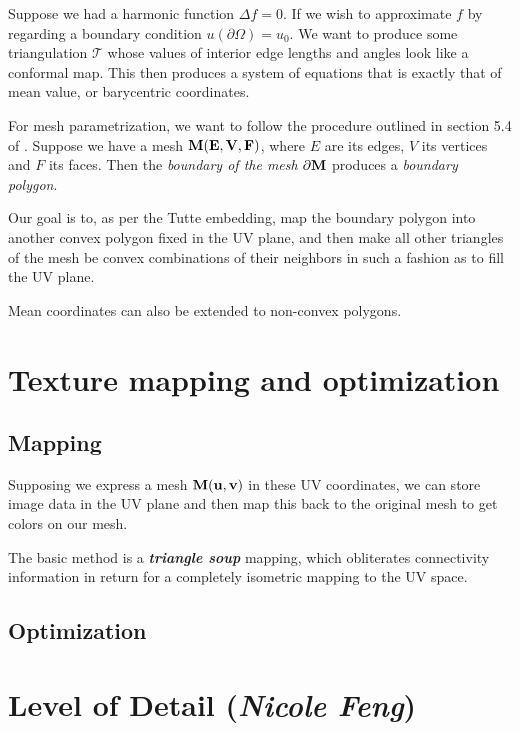 \spa

Suppose we had a harmonic function $\Delta f = 0$. If we wish to
approximate $f$ by regarding a boundary condition 
$u(\partial \Omega) = u_0$. We want to produce some triangulation
$\mathcal{T}$ whose values of interior edge lengths and angles
look like a conformal map. This then produces a system of equations
that is exactly that of mean value, or barycentric coordinates.

\spa

For mesh parametrization, we want to follow
the procedure outlined in section 5.4 of \cite{floater2}.
Suppose we have a mesh $\bf{M}(E,V, F)$, where $E$ are its edges,
$V$ its vertices and $F$ its faces. Then the \emph{boundary of the mesh}
$\partial\bf{M}$ produces a \emph{boundary polygon}.

\spa

Our goal is to, as per the Tutte embedding, map the boundary polygon
into another convex polygon fixed in the UV plane, and then make all
other triangles of the mesh be convex combinations of their neighbors
in such a fashion as to fill the UV plane.

\spa

Mean coordinates can also be extended to non-convex polygons.

\section{Texture mapping and optimization}

\subsection{Mapping}

Supposing we express a mesh $\bf{M(u,v)}$ in these UV coordinates,
we can store image data in the UV plane and then map this back to the
original mesh to get colors on our mesh.

\spa

The basic method is a \emph{\textbf{triangle soup}} mapping, which
obliterates connectivity information in return for a completely
isometric mapping to the UV space.

\subsection{Optimization}

\section{Level of Detail (\emph{Nicole Feng})}

